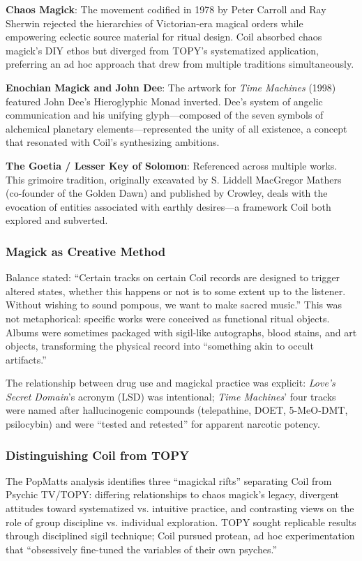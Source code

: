 \documentclass[11pt,letterpaper]{article}
\begin{document}
\textbf{Chaos Magick}: The movement codified in 1978 by Peter Carroll and Ray Sherwin rejected the hierarchies of Victorian-era magical orders while empowering eclectic source material for ritual design. Coil absorbed chaos magick's DIY ethos but diverged from TOPY's systematized application, preferring an ad hoc approach that drew from multiple traditions simultaneously.

\textbf{Enochian Magick and John Dee}: The artwork for \textit{Time Machines} (1998) featured John Dee's Hieroglyphic Monad inverted. Dee's system of angelic communication and his unifying glyph---composed of the seven symbols of alchemical planetary elements---represented the unity of all existence, a concept that resonated with Coil's synthesizing ambitions.

\textbf{The Goetia / Lesser Key of Solomon}: Referenced across multiple works. This grimoire tradition, originally excavated by S. Liddell MacGregor Mathers (co-founder of the Golden Dawn) and published by Crowley, deals with the evocation of entities associated with earthly desires---a framework Coil both explored and subverted.

\subsubsection{Magick as Creative Method}

Balance stated: ``Certain tracks on certain Coil records are designed to trigger altered states, whether this happens or not is to some extent up to the listener. Without wishing to sound pompous, we want to make sacred music.'' This was not metaphorical: specific works were conceived as functional ritual objects. Albums were sometimes packaged with sigil-like autographs, blood stains, and art objects, transforming the physical record into ``something akin to occult artifacts.''

The relationship between drug use and magickal practice was explicit: \textit{Love's Secret Domain}'s acronym (LSD) was intentional; \textit{Time Machines}' four tracks were named after hallucinogenic compounds (telepathine, DOET, 5-MeO-DMT, psilocybin) and were ``tested and retested'' for apparent narcotic potency.

\subsubsection{Distinguishing Coil from TOPY}

The PopMatts analysis identifies three ``magickal rifts'' separating Coil from Psychic TV/TOPY: differing relationships to chaos magick's legacy, divergent attitudes toward systematized vs. intuitive practice, and contrasting views on the role of group discipline vs. individual exploration. TOPY sought replicable results through disciplined sigil technique; Coil pursued protean, ad hoc experimentation that ``obsessively fine-tuned the variables of their own psyches.''
\end{document}
